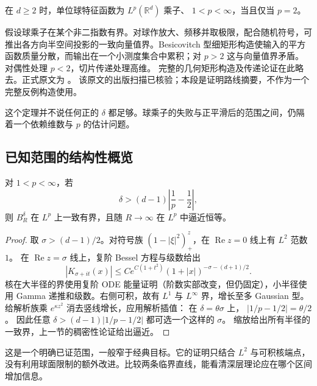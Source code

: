 \begin{theorem}\label{b2:thm:24-fefferman}
在 \(d\ge2\) 时，单位球特征函数为 \(L^p(\mathbb R^d)\) 乘子、
\(1<p<\infty\)，当且仅当 \(p=2\)。
\end{theorem}
\begin{proofsketch}
假设球乘子在某个非二指数有界。对球作放大、频移并取极限，配合随机符号，可推出各方向半空间投影的一致向量值界。Besicovitch 型细矩形构造使输入的平方函数质量分散，而输出在一个小测度集合中累积；对 \(p>2\) 这与向量值界矛盾。对偶性处理 \(p<2\)，切片传递处理高维。
完整的几何矩形构造及传递论证在此略去。正式原文为
\cite[Theorem 1; Section 2, pp.~330--336]{Fefferman1971Ball}。
该原文的出版扫描已核验；本段是证明路线摘要，不作为一个完整反例构造使用。
\end{proofsketch}
这个定理并不说任何正的 \(\delta\) 都足够。球乘子的失败与正平滑后的范围之间，仍隔着一个依赖维数与 \(p\) 的估计问题。

\subsection{已知范围的结构性概览}
\label{b2:subsec:240304}

\begin{theorem}[可直接证明的插值范围]\label{b2:thm:24-interpolation-range}
对 \(1<p<\infty\)，若
\[
 \delta>(d-1)\left|\frac1p-\frac12\right|,
\]
则 \(B_R^\delta\) 在 \(L^p\) 上一致有界，且随 \(R\to\infty\) 在 \(L^p\) 中逼近恒等。
\end{theorem}
\begin{proof}
取 \(\sigma>(d-1)/2\)。对符号族 \((1-|\xi|^2)_+^z\)，在
\(\operatorname{Re}z=0\) 线上有 \(L^2\) 范数 \(1\)。
在 \(\operatorname{Re}z=\sigma\) 线上，复阶 Bessel 方程与级数给出
\[
 |K_{\sigma+it}(x)|\le C e^{C(1+t^2)}
                (1+|x|)^{-\sigma-(d+1)/2}.
\]
核在大半径的界使用复阶 ODE 能量证明（阶数实部改变，但仍固定），小半径使用 Gamma 递推和级数。右侧可积，故有 \(L^1\) 与 \(L^\infty\) 界，增长至多 Gaussian 型。
给解析族乘 \(e^{\kappa z^2}\) 消去竖线增长，应用解析插值：
在 \(\delta=\theta\sigma\) 上，
\(|1/p-1/2|=\theta/2\)。
因此任意 \(\delta>(d-1)|1/p-1/2|\) 都可选一个这样的 \(\sigma\)。
缩放给出所有半径的一致界，上一节的稠密性论证给出逼近。
\end{proof}
这是一个明确已证范围，一般窄于经典目标。它的证明只结合 \(L^2\) 与可积核端点，没有利用球面限制的额外改进。比较两条临界直线，能看清深层理论应在哪个区间增加信息。

